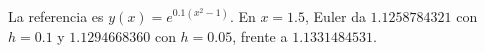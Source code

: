 La referencia es $y(x)=e^{0.1(x^2-1)}$. En $x=1.5$, Euler da $1.1258784321$ con $h=0.1$ y $1.1294668360$ con $h=0.05$, frente a $1.1331484531$.

